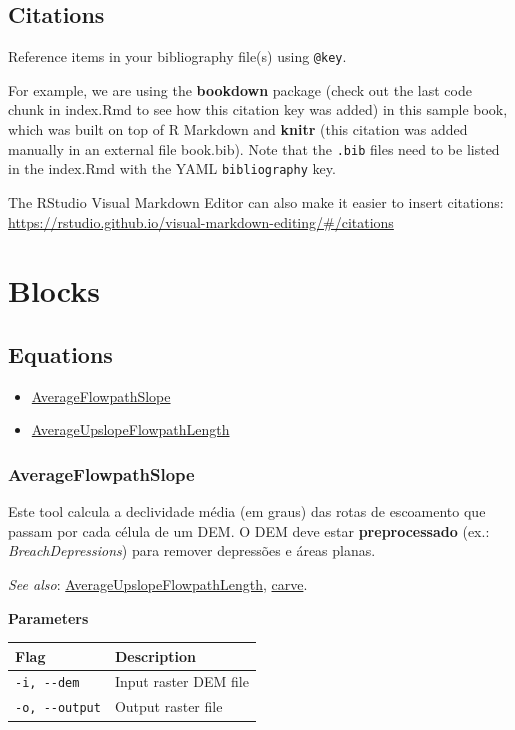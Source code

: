 \documentclass[
]{book}
\providecommand{\tightlist}{%
  \setlength{\itemsep}{0pt}\setlength{\parskip}{0pt}}
\theoremstyle{definition}
\theoremstyle{definition}
\theoremstyle{definition}
\theoremstyle{definition}
\theoremstyle{remark}
\begin{document}
\section{Citations}\label{citations}

Reference items in your bibliography file(s) using \texttt{@key}.

For example, we are using the \textbf{bookdown} package \citep{R-bookdown} (check out the last code chunk in index.Rmd to see how this citation key was added) in this sample book, which was built on top of R Markdown and \textbf{knitr} \citep{xie2015} (this citation was added manually in an external file book.bib).
Note that the \texttt{.bib} files need to be listed in the index.Rmd with the YAML \texttt{bibliography} key.

The RStudio Visual Markdown Editor can also make it easier to insert citations: \url{https://rstudio.github.io/visual-markdown-editing/\#/citations}

\chapter{Blocks}\label{blocks}

\section{Equations}\label{equations}

\begin{itemize}
\tightlist
\item
  \hyperref[AverageFlowpathSlope]{AverageFlowpathSlope}
\item
  \hyperref[AverageUpslopeFlowpathLength]{AverageUpslopeFlowpathLength}
\end{itemize}

\subsection{AverageFlowpathSlope}\label{AverageFlowpathSlope}

Este tool calcula a declividade média (em graus) das rotas de escoamento que passam por cada célula de um DEM.
O DEM deve estar \textbf{preprocessado} (ex.: \emph{BreachDepressions}) para remover depressões e áreas planas.

\emph{See also}: \hyperref[AverageUpslopeFlowpathLength]{AverageUpslopeFlowpathLength}, \hyperref[carve]{carve}.

\textbf{Parameters}

\begin{longtable}[]{@{}ll@{}}
\toprule\noalign{}
Flag & Description \\
\midrule\noalign{}
\endhead
\bottomrule\noalign{}
\endlastfoot
\texttt{-i,\ -\/-dem} & Input raster DEM file \\
\texttt{-o,\ -\/-output} & Output raster file \\
\end{longtable}
\end{document}
